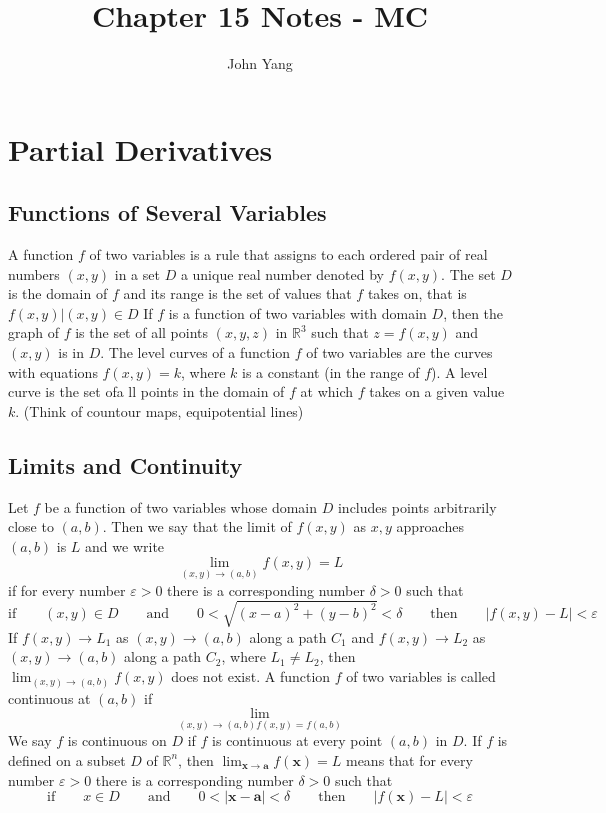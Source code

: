 \documentclass{article}
\title{Chapter 15 Notes - MC} %
\author{John Yang}
\begin{document}
    \maketitle
    \tableofcontents
    \section{Partial Derivatives} %
    \subsection{Functions of Several Variables} %
    \begin{outline}
        \1 A function $f$ of two variables is a rule that assigns to each ordered pair of real numbers \((x,y)\) in a set $D$ a unique real number denoted by \(f(x,y)\). The set $D$ is the domain of $f$ and its range is the set of values that $f$ takes on, that is \({f(x,y)|(x,y)\in D}\)
        \1 If $f$ is a function of two variables with domain $D$, then the graph of $f$ is the set of all points \((x,y,z)\) in \(\mathbb{R}^3\) such that \(z=f(x,y)\) and \((x,y)\) is in $D$. 
        \1 The level curves of a function $f$ of two variables are the curves with equations \(f(x,y)=k\), where $k$ is a constant (in the range of $f$). 
            \2 A level curve is the set ofa ll points in the domain of $f$ at which $f$ takes on a given value $k$. (Think of countour maps, equipotential lines)


    \end{outline}
    \subsection{Limits and Continuity}
    \begin{outline}
        \1 Let $f$ be a function of two variables whose domain $D$ includes points arbitrarily close to \((a,b)\). Then we say that the limit of \(f(x,y)\) as \(x,y\) approaches \((a,b)\) is $L$ and we write \[\lim_{(x,y)\to(a,b)}f(x,y)=L\] if for every number \(\varepsilon>0\) there is a corresponding number \(\delta>0\) such that \[\text{if}\qquad(x,y)\in D\qquad\text{and}\qquad 0<\sqrt{(x-a)^2+(y-b)^2}<\delta\qquad\text{then}\qquad|f(x,y)-L|<\varepsilon\]
        \1 If \(f(x,y)\to L_1\) as \((x,y)\to(a,b)\) along a path $C_1$ and \(f(x,y)\to L_2\) as \((x,y)\to(a,b)\) along a path $C_2$, where \(L_1\neq L_2\), then \(\lim_{(x,y)\to(a,b)}f(x,y)\) does not exist. 
        \1 A function $f$ of two variables is called continuous at \((a,b)\) if \[\lim_{(x,y)\to(a,b)f(x,y)=f(a,b)}\] We say $f$ is continuous on $D$ if $f$ is continuous at every point \((a,b)\) in $D$. 
        \1 If $f$ is defined on a subset $D$ of \(\mathbb{R}^n\), then \(\lim_{\mathbf x\to\mathbf a}f(\mathbf x)=L\) means that for every number \(\varepsilon>0\) there is a corresponding number \(\delta>0\) such that \[\text{if}\qquad x\in D\qquad\text{and}\qquad 0<|\mathbf x-\mathbf a|<\delta \qquad\text{then}\qquad |f(\mathbf x)-L|<\varepsilon\]
    \end{outline}
\end{document}
